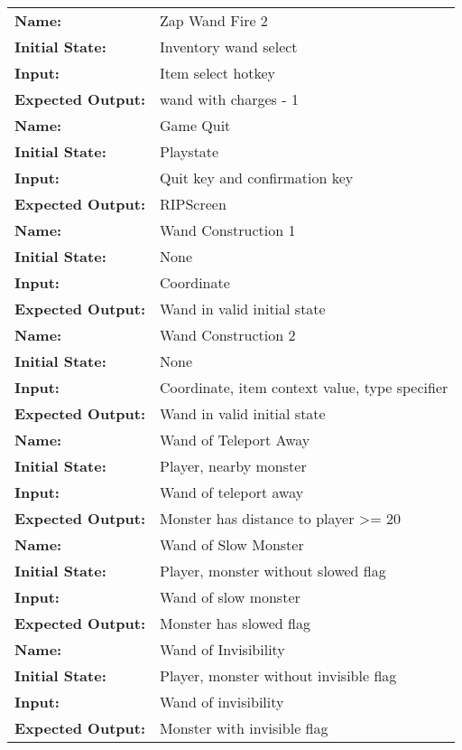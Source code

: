\documentclass[12pt, titlepage]{article}
\begin{document}
\begin{center}
\begin{longtable}{ l | p{10cm} }
				\hline
				\textbf{Name:} & Zap Wand Fire 2\\
				\textbf{Initial State:} & Inventory wand select\\
				\textbf{Input:} & Item select hotkey\\
				\textbf{Expected Output:} & wand with charges - 1\\
				\hline
				\textbf{Name:} & Game Quit\\
				\textbf{Initial State:} & Playstate\\
				\textbf{Input:} & Quit key and confirmation key\\
				\textbf{Expected Output:} & RIPScreen\\
				\hline
				\textbf{Name:} & Wand Construction 1\\
				\textbf{Initial State:} & None\\
				\textbf{Input:} & Coordinate\\
				\textbf{Expected Output:} & Wand in valid initial state\\
				\hline
				\textbf{Name:} & Wand Construction 2\\
				\textbf{Initial State:} & None\\
				\textbf{Input:} & Coordinate, item context value, type specifier\\
				\textbf{Expected Output:} & Wand in valid initial state\\
				\hline
				\textbf{Name:} & Wand of Teleport Away\\
				\textbf{Initial State:} & Player, nearby monster\\
				\textbf{Input:} & Wand of teleport away\\
				\textbf{Expected Output:} & Monster has distance to player >= 20\\
				\hline
				\textbf{Name:} & Wand of Slow Monster\\
				\textbf{Initial State:} & Player, monster without slowed flag\\
				\textbf{Input:} & Wand of slow monster\\
				\textbf{Expected Output:} & Monster has slowed flag\\
				\hline
				\textbf{Name:} & Wand of Invisibility\\
				\textbf{Initial State:} & Player, monster without invisible flag\\
				\textbf{Input:} & Wand of invisibility\\
				\textbf{Expected Output:} & Monster with invisible flag\\

\end{longtable}
\end{center}
\end{document}

